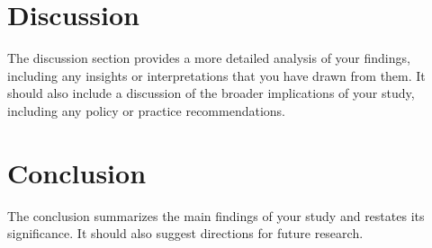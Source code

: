 \documentclass{article}
\begin{document}
\section{Discussion}
The discussion section provides a more detailed analysis of your findings, including any insights or interpretations that you have drawn from them. It should also include a discussion of the broader implications of your study, including any policy or practice recommendations.

\section{Conclusion}
The conclusion summarizes the main findings of your study and restates its significance. It should also suggest directions for future research.
\end{document}

